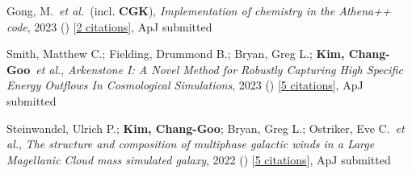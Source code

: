 \item Gong, M.~\textit{et al.}~(incl. \textbf{CGK}), \textit{Implementation of chemistry in the Athena++ code}, 2023 () [\href{http://adsabs.harvard.edu/abs/2023arXiv230504965G}{2 citations}], ApJ submitted

\item Smith, Matthew C.; Fielding, Drummond B.; Bryan, Greg L.; \textbf{Kim, Chang-Goo}~\textit{et al.}, \textit{Arkenstone I: A Novel Method for Robustly Capturing High Specific Energy Outflows In Cosmological Simulations}, 2023 () [\href{http://adsabs.harvard.edu/abs/2023arXiv230107116S}{5 citations}], ApJ submitted

\item Steinwandel, Ulrich P.; \textbf{Kim, Chang-Goo}; Bryan, Greg L.; Ostriker, Eve C.~\textit{et al.}, \textit{The structure and composition of multiphase galactic winds in a Large Magellanic Cloud mass simulated galaxy}, 2022 () [\href{http://adsabs.harvard.edu/abs/2022arXiv221203898S}{5 citations}], ApJ submitted